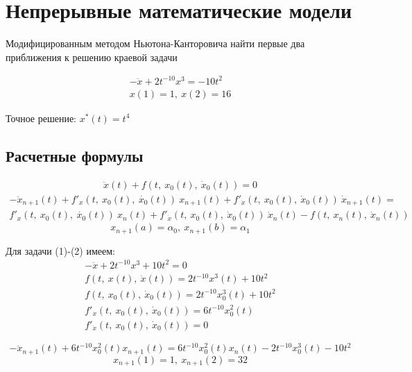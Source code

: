 \documentclass[12pt]{article}
\begin{document}
\section*{Непрерывные математические модели}

Модифицированным методом Ньютона-Канторовича найти первые два приближения к решению краевой задачи

\begin{gather}
	-\ddot{x} + 2t^{-10}x^3 = -10t^2 \\
	x(1)=1,\ x(2)=16
\end{gather}

Точное решение: $x^*(t) = t^4$

\subsection*{Расчетные формулы}



\begin{gather}
\ddot{x}(t) + f(t,\ x_0(t),\ \dot{x}_0(t)) = 0
\end{gather}
\begin{multline}
	-\ddot{x}_{n+1}(t) + f'_x(t,\ x_0(t),\ \dot{x_0}(t))\ x_{n+1}(t) +
	f'_{\dot{x}}(t,\ x_0(t),\ \dot{x}_0(t))\ \dot{x}_{n+1}(t) = \\
	f'_x(t,\ x_0(t),\ \dot{x_0}(t))\ x_n(t) +
	f'_{\dot{x}}(t,\ x_0(t),\ \dot{x}_0(t))\ \dot{x}_n(t) -
	f(t,\ x_n(t),\ \dot{x}_n(t))
\end{multline}
\begin{equation}
	x_{n+1}(a) = \alpha_0,\ x_{n+1}(b) = \alpha_1
\end{equation}

Для задачи (1)-(2) имеем:
\begin{gather*}
	-\ddot{x} + 2t^{-10}x^3 + 10t^2 = 0 \\
	f(t,\ x(t),\ \dot{x}(t)) = 2t^{-10}x^3(t) + 10t^2 \\
	f(t,\ x_0(t),\ \dot{x}_0(t)) = 2t^{-10}x^3_0(t) + 10t^2 \\
	f'_x(t,\ x_0(t),\ \dot{x}_0(t)) = 6t^{-10}x^2_0(t) \\
	f'_{\dot{x}}(t,\ x_0(t),\ \dot{x}_0(t)) = 0
\end{gather*}

\begin{equation}
    -\ddot{x}_{n+1}(t) + 6t^{-10}x^2_0(t)x_{n+1}(t) =
     6t^{-10}x^2_0(t)x_n(t) - 2t^{-10}x^3_0(t) - 10t^2
\end{equation}
\begin{equation}
    x_{n+1}(1)=1,\ x_{n+1}(2)=32
\end{equation}
\end{document}

